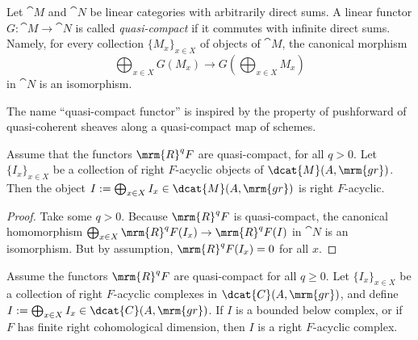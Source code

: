 \begin{dfn} \label{dfn:3888}
Let $\cat{M}$ and $\cat{N}$ be linear categories with arbitrarily direct sums. 
A linear functor 
$G : \cat{M} \to \cat{N}$ is called {\em quasi-compact} 
if it commutes with infinite direct sums. Namely, for every collection 
$\{ M_x \}_{x \in X}$ of objects of $\cat{M}$, the canonical morphism
\[ \bigoplus\nolimits_{x \in X} G(M_x) \to 
G \left( \bigoplus\nolimits_{x \in X} M_x \right) \]
in $\cat{N}$ is an isomorphism. 
\end{dfn}

The name ``quasi-compact functor'' is inspired by the property of pushforward 
of quasi-coherent sheaves along a quasi-compact map of schemes. 

\begin{lem} \label{lem:3890}
Assume that the functors $\mrm{R}^q F$ are quasi-compact, for all $q > 0$. Let 
$\{ I_x \}_{x \in X}$ be a collection of right $F$-acyclic objects of 
$\dcat{M}(A, \mrm{gr})$.
Then the object 
$I := \bigoplus_{x \in X} I_x \in \dcat{M}(A, \mrm{gr})$
is right $F$-acyclic.
\end{lem}

\begin{proof}
Take some $q > 0$. Because $\mrm{R}^qF$ is quasi-compact, the canonical 
homomorphism 
$\bigoplus_{x \in X} \mrm{R}^q F(I_x) \to \mrm{R}^q F(I)$
in $\cat{N}$ is an isomorphism. But by assumption, $\mrm{R}^q F(I_x) = 0$ 
for all $x$. 
\end{proof}

\begin{lem} \label{lem:1058}
Assume the functors $\mrm{R}^q F$ are quasi-compact for all $q \geq 0$. Let 
$\{ I_x \}_{x \in X}$ be a collection of right $F$-acyclic 
complexes in $\dcat{C}(A, \mrm{gr})$, and define 
$I := \bigoplus_{x \in X} I_x \in \dcat{C}(A, \mrm{gr})$.
If $I$ is a bounded below complex, or if $F$ has finite right cohomological 
dimension, then $I$ is a right $F$-acyclic complex.
\end{lem}

